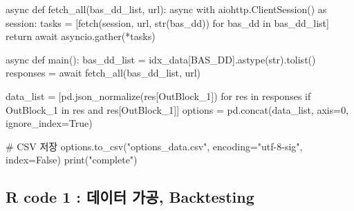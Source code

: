 \documentclass[
  a4paper,
  DIV=11,
  numbers=noendperiod]{scrreprt}
\newenvironment{Shaded}{\begin{snugshade}}{\end{snugshade}}
\newcommand{\BuiltInTok}[1]{\textcolor[rgb]{0.00,0.23,0.31}{#1}}
\newcommand{\CommentTok}[1]{\textcolor[rgb]{0.37,0.37,0.37}{#1}}
\newcommand{\ControlFlowTok}[1]{\textcolor[rgb]{0.00,0.23,0.31}{#1}}
\newcommand{\DecValTok}[1]{\textcolor[rgb]{0.68,0.00,0.00}{#1}}
\newcommand{\ImportTok}[1]{\textcolor[rgb]{0.00,0.46,0.62}{#1}}
\newcommand{\KeywordTok}[1]{\textcolor[rgb]{0.00,0.23,0.31}{#1}}
\newcommand{\NormalTok}[1]{\textcolor[rgb]{0.00,0.23,0.31}{#1}}
\newcommand{\OperatorTok}[1]{\textcolor[rgb]{0.37,0.37,0.37}{#1}}
\newcommand{\StringTok}[1]{\textcolor[rgb]{0.13,0.47,0.30}{#1}}
\newcommand{\VariableTok}[1]{\textcolor[rgb]{0.07,0.07,0.07}{#1}}
\begin{document}
\begin{Shaded}
\begin{Highlighting}[]
\ControlFlowTok{async} \KeywordTok{def}\NormalTok{ fetch\_all(bas\_dd\_list, url):}
    \ControlFlowTok{async} \ControlFlowTok{with}\NormalTok{ aiohttp.ClientSession() }\ImportTok{as}\NormalTok{ session:}
\NormalTok{        tasks }\OperatorTok{=}\NormalTok{ [fetch(session, url, }\BuiltInTok{str}\NormalTok{(bas\_dd)) }\ControlFlowTok{for}\NormalTok{ bas\_dd }\KeywordTok{in}\NormalTok{ bas\_dd\_list]}
        \ControlFlowTok{return} \ControlFlowTok{await}\NormalTok{ asyncio.gather(}\OperatorTok{*}\NormalTok{tasks)}

\ControlFlowTok{async} \KeywordTok{def}\NormalTok{ main():}
\NormalTok{    bas\_dd\_list }\OperatorTok{=}\NormalTok{ idx\_data[}\StringTok{\textquotesingle{}BAS\_DD\textquotesingle{}}\NormalTok{].astype(}\BuiltInTok{str}\NormalTok{).tolist()}
\NormalTok{    responses }\OperatorTok{=} \ControlFlowTok{await}\NormalTok{ fetch\_all(bas\_dd\_list, url)}

\NormalTok{    data\_list }\OperatorTok{=}\NormalTok{ [pd.json\_normalize(res[}\StringTok{\textquotesingle{}OutBlock\_1\textquotesingle{}}\NormalTok{]) }\ControlFlowTok{for}\NormalTok{ res }\KeywordTok{in}\NormalTok{ responses }\ControlFlowTok{if} \StringTok{\textquotesingle{}OutBlock\_1\textquotesingle{}} \KeywordTok{in}\NormalTok{ res }\KeywordTok{and}\NormalTok{ res[}\StringTok{\textquotesingle{}OutBlock\_1\textquotesingle{}}\NormalTok{]]}
\NormalTok{    options }\OperatorTok{=}\NormalTok{ pd.concat(data\_list, axis}\OperatorTok{=}\DecValTok{0}\NormalTok{, ignore\_index}\OperatorTok{=}\VariableTok{True}\NormalTok{)}

    \CommentTok{\# CSV 저장}
\NormalTok{    options.to\_csv(}\StringTok{"options\_data.csv"}\NormalTok{, encoding}\OperatorTok{=}\StringTok{"utf{-}8{-}sig"}\NormalTok{, index}\OperatorTok{=}\VariableTok{False}\NormalTok{)}
    \BuiltInTok{print}\NormalTok{(}\StringTok{"complete"}\NormalTok{)}
\end{Highlighting}
\end{Shaded}

\subsection*{R code 1 : 데이터 가공,
Backtesting}\label{r-code-1-uxb370uxc774uxd130-uxac00uxacf5-backtesting}
\end{document}
